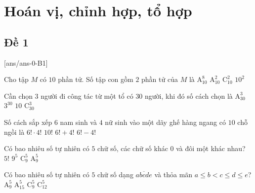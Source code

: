 \section{Hoán vị, chỉnh hợp, tổ hợp}

\subsection{Đề 1}
[ans/ans-0-B1]
\caulc
\begin{ex}%
Cho tập $M$ có $10$ phần tử. Số tập con gồm $2$ phần tử của $M$ là
\choice
{$\mathrm{A}_{10}^8$}
{$\mathrm{A}_{10}^2$}
{\True $\mathrm{C}_{10}^2$}
{$10^2$}
\end{ex}

\begin{ex}%
Cần chọn $3$ người đi công tác từ một tổ có $30$ người, khi đó số cách chọn là
\choice
{$\mathrm{A}_{30}^3$}
{$3^{30}$}
{$10$}
{\True $\mathrm{C}_{30}^3$}
\end{ex}

\begin{ex}%
Số cách sắp xếp $6$ nam sinh và $4$ nữ sinh vào một dãy ghế hàng ngang có $10$ chỗ ngồi là
\choice
{$6!\cdot 4!$}
{\True $10!$}
{$6!+4!$}
{$6!-4!$}
\end{ex}

\begin{ex}%
Có bao nhiêu số tự nhiên có $5$ chữ số, các chữ số khác $0$ và đôi một khác nhau?
\choice
{$5!$}
{$9^5$}
{$\mathrm{C}_9^5$}
{\True $\mathrm{A}_9^5$}
\end{ex}

\begin{ex}%
Có bao nhiêu số tự nhiên có $5$ chữ số dạng $\overline{abcde}$ và thỏa mãn $a\le b<c\le d\le e$?
\choice
{$\mathrm{A}_9^5$}
{$\mathrm{A}_{15}^5$}
{$\mathrm{C}_9^5$}
{\True $\mathrm{C}_{12}^5$}
\end{ex}

